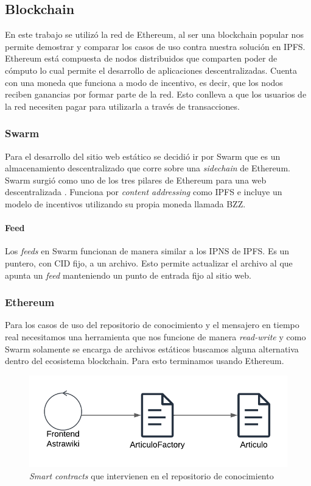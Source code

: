 \subsection{Blockchain}

En este trabajo se utilizó la red de Ethereum, al ser una blockchain popular nos permite demostrar y comparar los casos de uso contra nuestra solución en IPFS. Ethereum está compuesta de nodos distribuidos que comparten poder de cómputo lo cual permite el desarrollo de aplicaciones descentralizadas. Cuenta con una moneda que funciona a modo de incentivo, es decir, que los nodos reciben ganancias por formar parte de la red. Esto conlleva a que los usuarios de la red necesiten pagar para utilizarla a través de transacciones.

\subsubsection{Swarm}

Para el desarrollo del sitio web estático se decidió ir por Swarm que es un almacenamiento descentralizado que corre sobre una \textit{sidechain} de Ethereum. Swarm surgió como uno de los tres pilares de Ethereum para una web descentralizada \parencite{swarm-origin}. Funciona por \textit{content addressing} como IPFS e incluye un modelo de incentivos utilizando su propia moneda llamada BZZ.

\paragraph{Feed}

Los \textit{feeds} en Swarm funcionan de manera similar a los IPNS de IPFS. Es un puntero, con CID fijo, a un archivo. Esto permite actualizar el archivo al que apunta un \textit{feed} manteniendo un punto de entrada fijo al sitio web.

\subsubsection{Ethereum}

Para los casos de uso del repositorio de conocimiento y el mensajero en tiempo real necesitamos una herramienta que nos funcione de manera \textit{read-write} y como Swarm solamente se encarga de archivos estáticos buscamos alguna alternativa dentro del ecosistema blockchain. Para esto terminamos usando Ethereum.

\begin{figure}[H]
    \centering
    \includegraphics[width=0.5\linewidth]{img/astrawiki-articulo-factory.png}
    \caption{\textit{Smart contracts} que intervienen en el repositorio de conocimiento}
    \label{fig:aw-eth-articulo-factory}
\end{figure}

